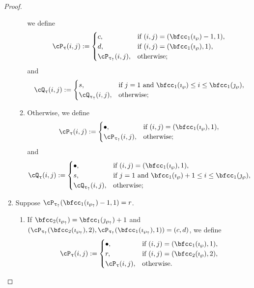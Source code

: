 \documentclass[12pt,a4paper]{amsart}
\def\wpu{\wp_{\uparrow}}
\def\wpd{\wp} %
\def\uptauu{\uptau_{\uparrow}}
\def\uptaud{\uptau} %
\numberwithin{equation}{section}
\theoremstyle{remark}
\begin{document}
\begin{proof}
\begin{enumerate}[label=(\alph*)]
\begin{enumerate}[label={\localtextbulletone}]
     we define
     \[
       \cP_{\uptaud}(i,j) := \begin{cases}
         c ,& \text{if $(i,j)=(\bfcc_{1}(\imath_{\wpd})-1,1)$},\\
         d ,& \text{if $(i,j)=(\bfcc_{1}(\imath_{\wpd}),1)$},\\
         \cP_{\uptauu}(i,j) ,&\text{otherwise};
       \end{cases}
     \]
     and
     \[
       \cQ_{\uptaud}(i,j) := \begin{cases}
         s ,& \text{if $j=1$ and $\bfcc_{1}(\imath_{\wpd})\leq i \leq \bfcc_{1}(\jmath_{\wpd})$},\\
         \cQ_{\uptauu}(i,j) ,&\text{otherwise};
       \end{cases}
     \]
     \item Otherwise, we define
     \[
       \cP_{\uptaud}(i,j) := \begin{cases}
         \bullet ,& \text{if $(i,j)=(\bfcc_{1}(\imath_{\wpd}),1)$},\\
         \cP_{\uptauu}(i,j) ,&\text{otherwise};
       \end{cases}
     \]
     and
     \[
       \cQ_{\uptaud}(i,j) := \begin{cases}
         \bullet ,& \text{if $(i,j)=(\bfcc_{1}(\imath_{\wpd}),1)$},\\
         s ,& \text{if $j=1$ and $\bfcc_{1}(\imath_{\wpd})+1\leq i \leq \bfcc_{1}(\jmath_{\wpd})$},\\
         \cQ_{\uptauu}(i,j) ,&\text{otherwise};
       \end{cases}
     \]
   \end{enumerate}
   \item Suppose $\cP_{\uptauu}(\bfcc_{1}(\imath_{\wpu})-1,1)=r$.
   \begin{enumerate}[label={\localtextbulletone}]
     \item If $\bfcc_{2}(\imath_{\wpu}) = \bfcc_{1}(\jmath_{\wpu})+1$
     and
     $(\cP_{\uptauu}(\bfcc_{2}(\imath_{\wpu}),2),\cP_{\uptauu}(\bfcc_{1}(\imath_{\wpu}),1) ) = (c,d)$,
     we define
     \[
       \cP_{\uptaud}(i,j) := \begin{cases}
         \bullet ,& \text{if $(i,j)=(\bfcc_{1}(\imath_{\wpd}),1)$},\\
         r ,& \text{if $(i,j)=(\bfcc_{2}(\imath_{\wpd}),2)$},\\
         \cP_{\uptaud}(i,j) ,&\text{otherwise}.

\end{cases}\]
\end{enumerate}
\end{enumerate}
\end{proof}
\end{document}
